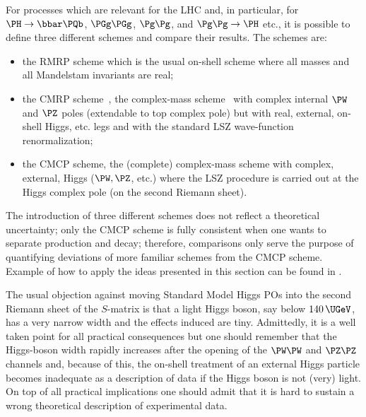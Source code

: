 For processes which are relevant for the LHC and, in particular, for 
$\PH \to \bbar \PQb$, $\PGg\PGg$, $\Pg\Pg$, and $\Pg\Pg \to \PH$ etc., it is 
possible to define three different schemes and compare their results. The 
schemes are:
\begin{itemize}

\item the RMRP scheme which is the usual on-shell scheme where all
  masses and all Mandelstam invariants are real;

\item the CMRP scheme~\cite{Actis:2008uh}, the complex-mass 
scheme~\cite{Denner:2005fg} with complex internal $\PW$ and $\PZ$ poles 
(extendable to top complex pole) but with real, external, on-shell Higgs, 
etc. legs and with the standard LSZ  wave-function renormalization;

\item the CMCP scheme, the (complete) complex-mass scheme with complex,
external, Higgs ($\PW, \PZ$, etc.) where the LSZ procedure is carried out at the 
Higgs complex pole (on the second Riemann sheet).

\end{itemize}
The introduction of three different schemes does not reflect a theoretical
uncertainty; only the CMCP scheme is fully consistent when one wants to
separate production and decay; therefore, comparisons only serve the purpose 
of quantifying deviations of more familiar schemes from the CMCP scheme.
Example of how to apply the ideas presented in this section can be found in
.

The usual objection against moving Standard Model Higgs POs into 
the second Riemann sheet of the $S$-matrix is that a light Higgs boson, say 
below $140\,\UGeV$, has a very narrow width and the effects induced are tiny. 
Admittedly, it is a well taken point for all practical consequences but
one should remember that the Higgs-boson width rapidly increases after 
the opening of the $\PW\PW$ and $\PZ\PZ$ channels and, because of this, 
the on-shell treatment of an external Higgs particle becomes inadequate as 
a description of data if the Higgs boson is not (very) light. 
On top of all practical implications one should admit that it is hard to sustain 
a wrong theoretical description of experimental data.

